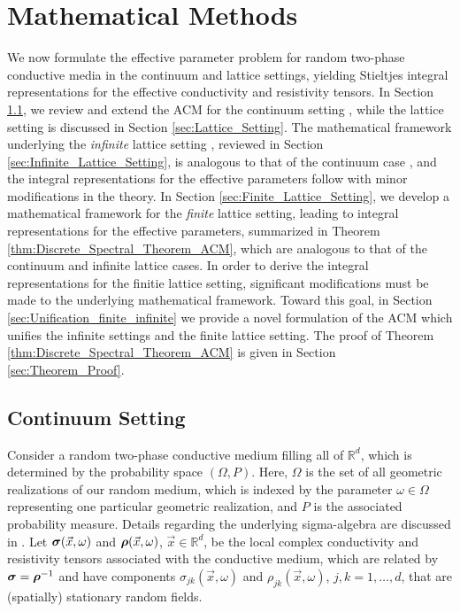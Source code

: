 \documentclass{cmslatex}
\newcommand\bsig{\mbox{\boldmath${\sigma}$}}
\newcommand\brho{\mbox{\boldmath${\rho}$}}
\begin{document}
    

\section{Mathematical Methods}\label{sec:Mathematical_Methods} 
%
We now formulate the effective parameter problem for random
two-phase conductive media in the continuum and lattice settings,
yielding Stieltjes integral representations for the effective
conductivity and resistivity tensors. In Section
\ref{sec:Continuum_Setting}, we review and extend the ACM for the
continuum setting \cite{Golden:CMP-473}, while the lattice setting is
discussed in Section \ref{sec:Lattice_Setting}. The mathematical
framework underlying the \emph{infinite} lattice setting
\cite{Bruno:JSP-365,Golden:CMP-467}, reviewed in Section 
\ref{sec:Infinite_Lattice_Setting}, is analogous to that of
the continuum case \cite{Bruno:JSP-365}, and the integral
representations for the effective parameters follow with minor
modifications in the theory. In Section
\ref{sec:Finite_Lattice_Setting}, we develop a mathematical
framework for the \emph{finite} lattice setting, leading to integral 
representations for the effective parameters, summarized in Theorem 
\ref{thm:Discrete_Spectral_Theorem_ACM}, which are analogous to that
of the continuum and infinite lattice cases. In order to derive the
integral representations for the finitie lattice setting, significant
modifications must be made to the underlying mathematical
framework. Toward this goal, in Section
\ref{sec:Unification_finite_infinite} we provide a novel formulation
of the ACM which unifies the infinite settings and the finite lattice
setting. The proof of Theorem \ref{thm:Discrete_Spectral_Theorem_ACM}
is given in Section \ref{sec:Theorem_Proof}.    



\subsection{Continuum Setting}\label{sec:Continuum_Setting}
%
Consider a random two-phase conductive medium filling all of
$\mathbb{R}^d$, which is determined by the probability space
$(\Omega,P)$. Here, $\Omega$ is the set of all  geometric realizations of our
random medium, which is indexed by the parameter $\omega\in\Omega$ representing
one particular geometric realization, and $P$ is the associated
probability measure. Details regarding the underlying sigma-algebra
are discussed in \cite{Papanicolaou:RF-835}. Let $\bsig(\vec{x},\omega)$
and $\brho(\vec{x},\omega)$, $\vec{x}\in\mathbb{R}^d$, be the local complex
conductivity and resistivity tensors associated with the conductive
medium, which are related by $\bsig=\brho^{-1}$ and have components
$\sigma_{jk}(\vec{x},\omega)$ and $\rho_{jk}(\vec{x},\omega)$, $j,k=1,\ldots,d$, that are
(spatially) stationary random fields. 
\end{document}
